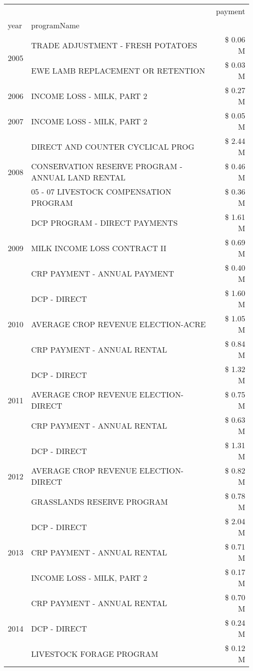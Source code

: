 \begin{tabular}{llr}
\toprule
 &  & payment \\
year & programName &  \\
\midrule
\multirow[t]{2}{*}{2005} & TRADE ADJUSTMENT - FRESH POTATOES & \$ 0.06 M \\
 & EWE LAMB REPLACEMENT OR RETENTION & \$ 0.03 M \\
\cline{1-3}
2006 & INCOME LOSS - MILK, PART 2 & \$ 0.27 M \\
\cline{1-3}
2007 & INCOME LOSS - MILK, PART 2 & \$ 0.05 M \\
\cline{1-3}
\multirow[t]{3}{*}{2008} & DIRECT AND COUNTER CYCLICAL PROG & \$ 2.44 M \\
 & CONSERVATION RESERVE PROGRAM - ANNUAL LAND RENTAL & \$ 0.46 M \\
 & 05 - 07 LIVESTOCK COMPENSATION PROGRAM & \$ 0.36 M \\
\cline{1-3}
\multirow[t]{3}{*}{2009} & DCP PROGRAM - DIRECT PAYMENTS & \$ 1.61 M \\
 & MILK INCOME LOSS CONTRACT II & \$ 0.69 M \\
 & CRP PAYMENT - ANNUAL PAYMENT & \$ 0.40 M \\
\cline{1-3}
\multirow[t]{3}{*}{2010} & DCP - DIRECT & \$ 1.60 M \\
 & AVERAGE CROP REVENUE ELECTION-ACRE & \$ 1.05 M \\
 & CRP PAYMENT - ANNUAL RENTAL & \$ 0.84 M \\
\cline{1-3}
\multirow[t]{3}{*}{2011} & DCP - DIRECT & \$ 1.32 M \\
 & AVERAGE CROP REVENUE ELECTION-DIRECT & \$ 0.75 M \\
 & CRP PAYMENT - ANNUAL RENTAL & \$ 0.63 M \\
\cline{1-3}
\multirow[t]{3}{*}{2012} & DCP - DIRECT & \$ 1.31 M \\
 & AVERAGE CROP REVENUE ELECTION-DIRECT & \$ 0.82 M \\
 & GRASSLANDS RESERVE PROGRAM & \$ 0.78 M \\
\cline{1-3}
\multirow[t]{3}{*}{2013} & DCP - DIRECT & \$ 2.04 M \\
 & CRP PAYMENT - ANNUAL RENTAL & \$ 0.71 M \\
 & INCOME LOSS - MILK, PART 2 & \$ 0.17 M \\
\cline{1-3}
\multirow[t]{3}{*}{2014} & CRP PAYMENT - ANNUAL RENTAL & \$ 0.70 M \\
 & DCP - DIRECT & \$ 0.24 M \\
 & LIVESTOCK FORAGE PROGRAM & \$ 0.12 M \\

\end{tabular}
